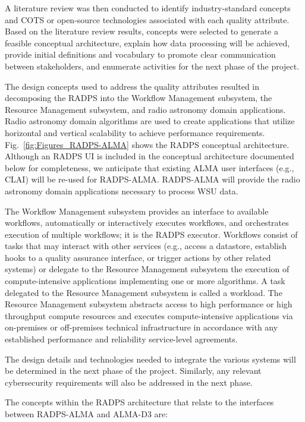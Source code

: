 A literature review was then conducted to identify industry-standard concepts and \ac{COTS} or open-source technologies associated with each quality attribute. Based on the literature review results, concepts were selected to generate a feasible conceptual architecture, explain how data processing will be achieved, provide initial definitions and vocabulary to promote clear communication between stakeholders, and enumerate activities for the next phase of the project. 

The design concepts used to address the quality attributes resulted in decomposing the RADPS into the Workflow Management subsystem, the Resource Management subsystem, and radio astronomy domain applications. Radio astronomy domain algorithms are used to create applications that utilize horizontal and vertical scalability to achieve performance requirements. Fig.~\ref{fig:Figures_RADPS-ALMA} shows the RADPS conceptual architecture. Although an RADPS \ac{UI} is included in the conceptual architecture documented below for completeness, we anticipate that existing ALMA user interfaces (e.g., \ac{CLAI}) will be re-used for RADPS-ALMA. RADPS-ALMA will provide the radio astronomy domain applications necessary to process WSU data.

The Workflow Management subsystem provides an interface to available workflows, automatically or interactively executes workflows, and orchestrates execution of multiple workflows; it is the RADPS executor. Workflows consist of tasks that may interact with other services (e.g., access a datastore, establish hooks to a quality assurance interface, or trigger actions by other related systems) or delegate to the Resource Management subsystem the execution of compute-intensive applications implementing one or more algorithms. A task delegated to the Resource Management subsystem is called a workload. The Resource Management subsystem abstracts access to high performance or high throughput compute resources and executes compute-intensive applications via on-premises or off-premises technical infrastructure in accordance with any established performance and reliability service-level agreements.  

The design details and technologies needed to integrate the various systems will be determined in the next phase of the project. Similarly, any relevant cybersecurity requirements will also be addressed in the next phase.

\label{sec:RADPS-ALMA-interfaces}
The concepts within the RADPS architecture that relate to the interfaces between RADPS-ALMA and ALMA-D3 are: 

